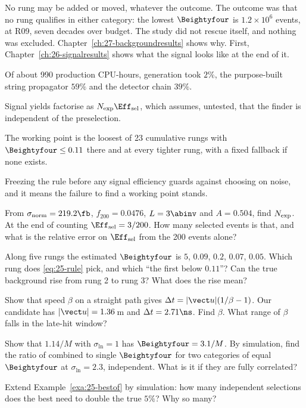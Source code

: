 No rung may be added or moved, whatever the outcome. The outcome was that no rung qualifies in either
category: the lowest $\Beightyfour$ is $1.2\times10^6$ events, at R09, seven decades over budget. The study did not rescue itself, and
nothing was excluded. Chapter~\ref{ch:27-backgroundresults} shows why. First, Chapter~\ref{ch:26-signalresults} shows what the signal
looks like at the end of it.

\begin{chaptersummary}
  \item Of about 990 production CPU-hours, generation took $2\%$, the purpose-built string propagator $59\%$ and the detector chain $39\%$.
  \item Signal yields factorise as $N_{\rm exp}\Eff_{\rm sel}$, which assumes, untested, that the finder is independent of the preselection.
  \item The working point is the loosest of 23 cumulative rungs with $\Beightyfour\le0.11$ there and at every tighter rung, with a
  fixed fallback if none exists.
  \item Freezing the rule before any signal efficiency guards against choosing on noise, and it means the failure to find a working point stands.
\end{chaptersummary}

\begin{exercises}
  \item\label{ex:25-yield} From $\sigma_{\rm norm}=219.2\fb$, $f_{200}=0.0476$, $L=3\abinv$ and $A=0.504$, find $N_{\rm exp}$. At the end of counting $\Eff_{\rm sel}=3/200$. How many selected events is that,
  and what is the relative error on $\Eff_{\rm sel}$ from the 200 events alone?
  \item\label{ex:25-guard} Along five rungs the estimated $\Beightyfour$ is $5$, $0.09$, $0.2$, $0.07$, $0.05$. Which rung does \eqref{eq:25-rule} pick, and which ``the first
  below $0.11$''? Can the true background rise from rung 2 to rung 3? What does the rise mean?
  \item\label{ex:25-tof} Show that speed $\beta$ on a straight path gives $\Delta t=|\vect u|(1/\beta-1)$. Our candidate has $|\vect u|=1.36$\,m and
  $\Delta t=2.71\ns$. Find $\beta$. What range of $\beta$ falls in the late-hit window?
  \item\label{ex:25-lognormal} Show that $1.14/M$ with $\sigma_{\ln}=1$ has $\Beightyfour=3.1/M$. By simulation, find the ratio of combined to single $\Beightyfour$ for two categories of equal
  $\Beightyfour$ at $\sigma_{\ln}=2.3$, independent. What is it if they are fully correlated?
  \item\label{ex:25-best} Extend Example~\ref{exa:25-bestof} by simulation: how many independent selections does the best need to double the true $5\%$? Why so many?
\end{exercises}
